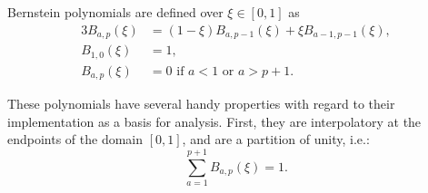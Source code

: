 \documentclass[./]{subfiles}
\begin{document}
Bernstein polynomials are defined over $\xi \in [0,1]$ as 
\begin{alignat}{3}
B_{a, p}(\xi) &= (1-\xi) B_{a, p-1}(\xi) + \xi B_{a-1,p-1}(\xi), \\
B_{1, 0}(\xi) &= 1, \\
B_{a, p}(\xi) &= 0 \text{ if } a<1 \text{ or } a > p+1.
\end{alignat}

These polynomials have several handy properties with regard to their implementation as a basis for analysis. First, they are interpolatory at the endpoints of the domain $[0,1]$, and are a partition of unity, i.e.:
\begin{equation*}
\sum_{a=1}^{p+1} B_{a,p}(\xi) = 1.
\end{equation*}
\end{document}
